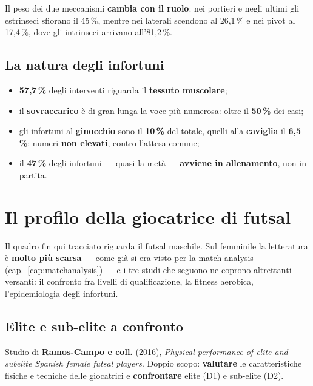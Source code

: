 Il peso dei due meccanismi \textbf{cambia con il ruolo}: nei portieri e negli ultimi gli
estrinseci sfiorano il 45\,\%, mentre nei laterali scendono al 26,1\,\% e nei pivot al 17,4\,\%,
dove gli intrinseci arrivano all'81,2\,\%.

\subsection{La natura degli infortuni}

\begin{itemize}
  \item \textbf{57,7\,\%} degli interventi riguarda il \textbf{tessuto muscolare};
  \item il \textbf{sovraccarico} è di gran lunga la voce più numerosa: oltre il \textbf{50\,\%}
    dei casi;
  \item gli infortuni al \textbf{ginocchio} sono il \textbf{10\,\%} del totale, quelli alla
    \textbf{caviglia} il \textbf{6,5\,\%}: numeri \textbf{non elevati}, contro l'attesa comune;
  \item il \textbf{47\,\%} degli infortuni --- quasi la metà --- \textbf{avviene in allenamento},
    non in partita.
\end{itemize}

\section{Il profilo della giocatrice di futsal}

Il quadro fin qui tracciato riguarda il futsal maschile. Sul femminile la letteratura è
\textbf{molto più scarsa} --- come già si era visto per la match analysis
(cap.~\ref{cap:matchanalysis}) --- e i tre studi che seguono ne coprono altrettanti versanti:
il confronto fra livelli di qualificazione, la fitness aerobica, l'epidemiologia degli infortuni.

\subsection{Elite e sub-elite a confronto}

Studio di \textbf{Ramos-Campo e coll.} (2016), \textit{Physical performance of elite and subelite
Spanish female futsal players}. Doppio scopo: \textbf{valutare} le caratteristiche fisiche e
tecniche delle giocatrici e \textbf{confrontare} elite (D1) e sub-elite (D2).

